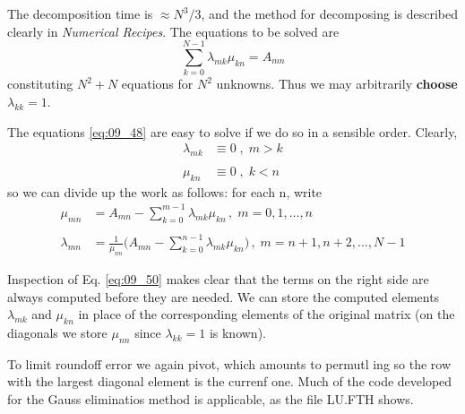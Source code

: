 The decomposition time is $\approx N^3/3$, and the method for decomposing is
described clearly in \textit{Numerical Recipes}. The equations
to be solved are
\begin{equation}
    \label{eq:09_48}
    \sum_{k=0}^{N-1}\lambda_{mk}\mu_{kn}=A_{mn}
\end{equation}
constituting $N^2 + N$ equations for $N^2$ unknowns. Thus we may
arbitrarily \textbf{choose} $\lambda_{kk} = 1$.

The equations \ref{eq:09_48} are easy to solve if we do so in a sensible order.
Clearly,
\begin{align}
    \label{eq:09_49}
    \lambda_{mk} &\equiv 0\;,\; m > k  \nonumber \\
    &\\
    \mu_{kn} &\equiv 0\;,\; k < n  \nonumber
\end{align}
so we can divide up the work as follows: for each n, write
\begin{align}
    \label{eq:09_50}
    \mu_{mn} &= A_{mn} - \sum_{k=0}^{m-1}\lambda_{mk}\mu_{kn}\,,\;m=0,1,\dotsc,n  \nonumber \\
    & \\
    \lambda_{mn} &=\frac{1}{\mu_{nn}}\Big(A_{mn}-\sum_{k=0}^{n-1}\lambda_{mk}\mu_{kn}\Big)\,,\; m=n+1, n+2, \dotsc, N-1  \nonumber
\end{align}

Inspection of Eq. \ref{eq:09_50} makes clear that the terms on the right side
are always computed before they are needed. We can store the
computed elements $\lambda_{mk}$ and $\mu_{kn}$ in place of the corresponding
elements of the original matrix (on the diagonals we store  $\mu_{nn}$
since $\lambda_{kk} = 1$ is known).

To limit roundoff error we again pivot, which amounts to permutl
ing so the row with the largest diagonal element is the currenf
one. Much of the code developed for the Gauss eliminatios
method is applicable, as the file LU.FTH shows.

